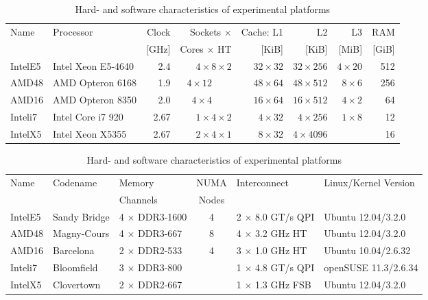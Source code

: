\documentclass[a4paper]{myjournal}
\begin{document}
\begin{table}\centering\small\def\tabcolsep{3.5pt}
\caption{Hard- and software characteristics of experimental platforms}\label{tab:hardware}
\begin{tabular}{l|l|r|r||r|r|r|r}
Name    & Processor          & Clock & Sockets $\times$                     & Cache: L1      & L2              & L3            & RAM   \\
        &                    & [GHz] & Cores $\times$ HT                    & [KiB]          & [KiB]           & [MiB]         & [GiB] \\\hline
IntelE5 & Intel Xeon E5-4640 & 2.4   & $4 \times 8 \times 2$                & $32 \times 32$ & $32 \times 256$ & $4 \times 20$ & 512   \\
AMD48   & AMD Opteron 6168   & 1.9   & $4 \times 12 \:\phantom{\:\times 1}$ & $48 \times 64$ & $48 \times 512$ & $8 \times 6$  & 256   \\
AMD16   & AMD Opteron 8350   & 2.0   & $4 \times 4 \:\phantom{\:\times 1}$  & $16 \times 64$ & $16 \times 512$ & $4 \times 2$  & 64    \\
Inteli7 & Intel Core i7 920  & 2.67  & $1 \times 4 \times 2$                & $4 \times 32$  & $4 \times 256$  & $1 \times 8$  & 12    \\
IntelX5 & Intel Xeon X5355   & 2.67  & $2 \times 4 \times 1$                & $8 \times 32$  & $4 \times 4096$ &               & 16    \\ 
\end{tabular}

\bigskip
\def\tabcolsep{2.0pt}
\begin{tabular}{l|l|l|c|l|l}
Name    & Codename     & Memory               & NUMA  & Interconnect            & Linux/Kernel Version \\
        &              & Channels             & Nodes &                         &                      \\ \hline
IntelE5 & Sandy Bridge & 4 $\times$ DDR3-1600 & 4     & 2 $\times$ 8.0 GT/s QPI & Ubuntu 12.04/3.2.0   \\
AMD48   & Magny-Cours  & 4 $\times$ DDR3-667  & 8     & 4 $\times$ 3.2 GHz HT   & Ubuntu 12.04/3.2.0   \\
AMD16   & Barcelona    & 2 $\times$ DDR2-533  & 4     & 3 $\times$ 1.0 GHz HT   & Ubuntu 10.04/2.6.32  \\
Inteli7 & Bloomfield   & 3 $\times$ DDR3-800  &       & 1 $\times$ 4.8 GT/s QPI & openSUSE 11.3/2.6.34 \\
IntelX5 & Clovertown   & 2 $\times$ DDR2-667  &       & 1 $\times$ 1.3 GHz FSB  & Ubuntu 12.04/3.2.0   \\
\end{tabular}
\end{table}
\end{document}
